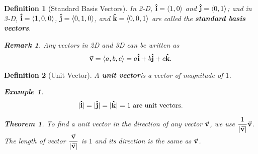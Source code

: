 \documentclass[12pt,a4paper]{article}
\newtheorem{thm}{Theorem}[subsection]
\newtheorem{df}{Definition}[subsection]
\newtheorem{eg}{Example}[subsection]
\newtheorem*{rmk}{\indent Remark}
\def\vecv{\va{v}}
\def\veci{\vu{\boldsymbol{\textbf{i}}}}
\def\vecj{\vu{\boldsymbol{\textbf{j}}}}
\def\veck{\vu{\boldsymbol{\textbf{k}}}}
\begin{document}
\begin{df}[Standard Basis Vectors]
	In 2-D, $\veci=\langle 1,0\rangle$ and $\vecj=\langle0,1\rangle$; and in 3-D, $\veci=\langle1,0,0\rangle$, $\vecj=\langle0,1,0\rangle$, and $\veck=\langle0,0,1\rangle$ are called the \textbf{standard basis vectors}. 
	\begin{rmk} Any vectors in 2D and 3D can be written as \[\vecv=\langle a,b,c\rangle=a\veci+b\vecj+c\veck.\]\end{rmk}
\end{df}
\begin{df}[Unit Vector]
	A \textbf{unit vector}is a vector of magnitude of $1$. 
	\begin{eg} \[|\veci|=|\vecj|=|\veck|=1\text{ are unit vectors.}\]\end{eg}
	\begin{thm}
		To find a unit vector in the direction of any vector $\vecv$, we use $\displaystyle\frac{1}{|\vecv|}\vecv$. The length of vector $\displaystyle\frac{\vecv}{|\vecv|}$ is $1$ and its direction is the same as $\vecv$.	
	\end{thm}
\end{df}
\end{document}
